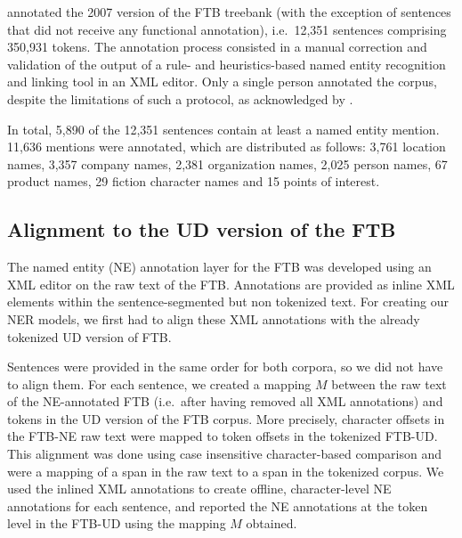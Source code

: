  annotated the 2007 version of the FTB treebank (with the exception of sentences that did not receive any functional annotation), i.e.~12,351 sentences comprising 350,931 tokens. The annotation process consisted in a manual correction and validation of the output of a rule- and heuristics-based named entity recognition and linking tool in an XML editor. 
Only a single person annotated the corpus, despite the limitations of such a protocol, as acknowledged by .

In total, 5,890 of the 12,351 sentences contain at least a named entity mention. 11,636 mentions were annotated, which are distributed as follows:
3,761 location names, 3,357 company names, 2,381 organization names, 2,025 person names, 67 product names, 29 fiction character names and 15 points of interest.

\subsection{Alignment to the UD version of the FTB}
\label{subsec:alignment}

The named entity (NE) annotation layer for the FTB was developed using an XML editor on the raw text of the FTB. Annotations are provided as inline XML elements within the sentence-segmented but non tokenized text. For creating our NER models, we first had to align these XML annotations with the already tokenized UD version of FTB.

Sentences were provided in the same order for both corpora, so we did not have to align them.
For each sentence, we created a mapping $M$ between the raw text of the NE-annotated FTB (i.e.~after having removed all XML annotations) and tokens in the UD version of the FTB corpus. More precisely, character offsets in the FTB-NE raw text were mapped to token offsets in the tokenized FTB-UD.
This alignment was done using case insensitive character-based comparison and were a mapping of a span in the raw text to a span in the tokenized corpus.
We used the inlined XML annotations to create offline, character-level NE annotations for each sentence, and reported the NE annotations at the token level in the FTB-UD using the mapping $M$ obtained.

